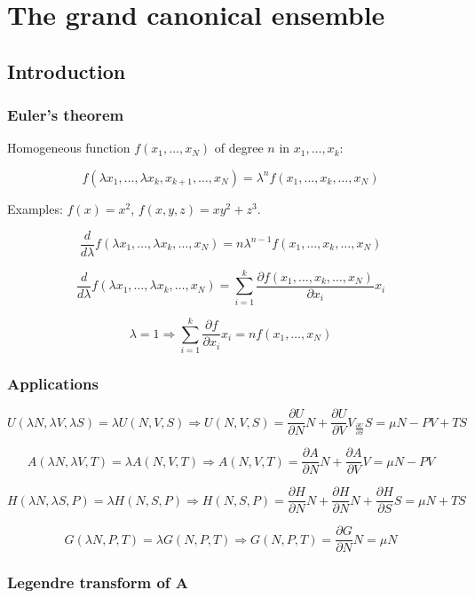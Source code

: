 \graphicspath{{chapters/13/images}}
\chapter{The grand canonical ensemble}

\section{Introduction}

	\subsection{Euler's theorem}
	Homogeneous function $f(x_1, \dots, x_N)$ of degree $n$ in $x_1, \dots, x_k$:

	$$f(\lambda x_1, \dots, \lambda x_k, x_{k+1}, \dots, x_N) = \lambda^n f(x_1, \dots, x_k, \dots, x_N)$$

	Examples: $f(x) = x^2$, $f(x, y, z) = xy^2+z^3$.

	$$\frac{d}{d\lambda} f(\lambda x_1, \dots, \lambda x_k, \dots, x_N) = n\lambda^{n-1}f(x_1, \dots, x_k,\dots, x_N)$$

	$$\frac{d}{d\lambda}f(\lambda x_1, \dots, \lambda x_k, \dots, x_N) = \sum\limits_{i=1}^k\frac{\partial f(x_1, \dots, x_k, \dots, x_N)}{\partial x_i}x_i$$

	$$\lambda = 1 \Rightarrow \sum\limits_{i=1}^k\frac{\partial f}{\partial x_i}x_i = nf(x_1, \dots, x_N)$$

	\subsection{Applications}

	$$U(\lambda N, \lambda V, \lambda S) = \lambda U(N, V, S)\Rightarrow U(N, V, S) = \frac{\partial U}{\partial N}N + \frac{\partial U}{\partial V}V_\frac{\partial U}{\partial S}S = \mu N - PV + TS$$

	$$A(\lambda N, \lambda V, T) = \lambda A(N, V, T) \Rightarrow A(N, V, T) = \frac{\partial A}{\partial N}N + \frac{\partial A}{\partial V}V = \mu N - PV$$

	$$H(\lambda N, \lambda S, P) = \lambda H(N, S, P)\Rightarrow H(N, S, P) = \frac{\partial H}{\partial N}N+\frac{\partial H}{\partial N}N+\frac{\partial H}{\partial S}S = \mu N+TS$$

	$$G(\lambda N, P, T) = \lambda G(N, P, T)\Rightarrow G(N, P, T) = \frac{\partial G}{\partial N}N= \mu N$$

	\subsection{Legendre transform of A}


